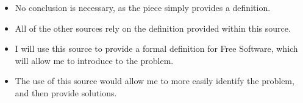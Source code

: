 \begin{enumerate}
\begin{itemize}
      \item No conclusion is necessary, as the piece simply provides a definition.

      \item All of the other sources rely on the definition provided within this source.

      \item I will use this source to provide a formal definition for Free Software, which will allow me to introduce to the problem.

      \item The use of this source would allow me to more easily identify the problem, and then provide solutions.

    \end{itemize}

\end{enumerate}



